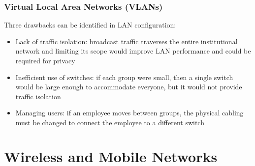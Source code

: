 \documentclass{article}
\begin{document}
\subsubsection{Virtual Local Area Networks (VLANs)}
Three drawbacks can be identified in LAN configuration:
\begin{itemize}
    \item Lack of traffic isolation: broadcast traffic traverses the entire institutional network and limiting its scope would improve LAN performance and could be required for privacy
    \item Inefficient use of switches: if each group were small, then a single switch would be large enough to accommodate everyone, but it would not provide traffic isolation
    \item Managing users: if an employee moves between groups, the physical cabling must be changed to connect the employee to a different switch
\end{itemize}

\section{Wireless and Mobile Networks}
\end{document}
